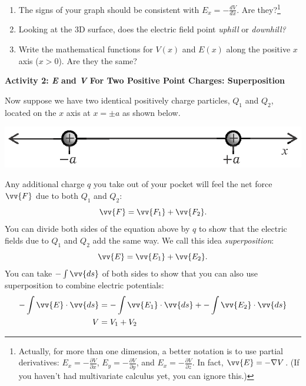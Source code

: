 \begin{enumerate}[wide, label=(\emph{\alph*})]
\item The signs of your graph should be consistent with 
$\displaystyle E_x=-\frac{dV}{dx}$. Are they?\footnote{Actually, for more than one dimension, a better notation is to use partial derivatives: 
$\displaystyle E_x=-\frac{\partial V}{\partial x}$,  
$\displaystyle E_y=-\frac{\partial V}{\partial y}$, and 
$\displaystyle E_x=-\frac{\partial V}{\partial z}$.
In fact, $\vv{E}=-\nabla V$.  (If you haven't had multivariate calculus yet, you can ignore this.)}
\answerspace{0.3in}

\item Looking at the 3D surface, does the electric field point \textit{uphill} or \textit{downhill?}
\answerspace{0.3in}

\item Write the mathematical functions for $V(x)$ and $E(x)$ along the positive $x$ axis ($x > 0$).  Are they the same?
\answerspace{0.3in}

\end{enumerate}

\textbf{Activity 2: \textit{E} and \textit{V} For Two Positive Point Charges: Superposition}

Now suppose we have two identical positively charge particles, $Q_1$ and $Q_2$, located on the $x$ axis at $x= \pm a$ as shown below.
\begin{center}
\includegraphics{potential_superposition/activity_2_3_figs/charges_on_x_axis.eps}
\end{center}

Any additional charge $q$ you take out of your pocket will feel the net force $\vv{F}$ due to both $Q_1$ and $Q_2$:
$$\vv{F} = \vv{F_1} + \vv{F_2}.$$
You can divide both sides of the equation above by $q$ to show that the electric fields due to $Q_1$ and $Q_2$ add the same way.  We call this idea \textit{superposition}:
$$\vv{E} = \vv{E_1} + \vv{E_2}.$$
You can take $-\int \vv{ds}$ of both sides to show that you can also use superposition to combine electric potentials:
\begin{align*}
-\int{\vv{E} \cdot \vv{ds}} %
&= -\int{\vv{E_1} \cdot \vv{ds}} + -\int{\vv{E_2} \cdot \vv{ds}} \\
V &= V_1 + V_2
\end{align*}

